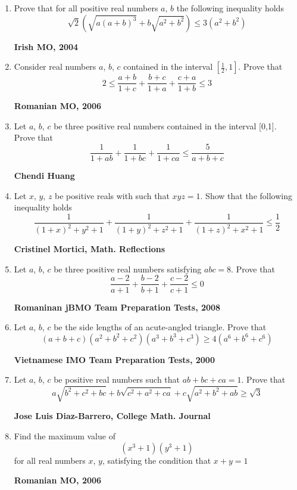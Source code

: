 \documentclass{article}
\begin{document}
\begin{enumerate}
\item Prove that for all positive real numbers $a $, $b $ the following inequality holds $$\sqrt {2}\left (\sqrt {a (a+b)^3}+b\sqrt {a^2+b^2} \right )\leq 3\left (a^2+b^2 \right )$$
\begin{flushright}
\textbf{Irish MO, 2004}
\end{flushright}
\item Consider real numbers  $a $, $b $, $c $ contained in the interval  $\left [\frac {1}{2},1 \right ]$. Prove that $$2\leq \frac{a+b}{1+c}+ \frac{b+c}{1+a} +\frac{c+a}{1+b}\leq 3$$
\begin {flushright}
\textbf{Romanian MO, 2006}
\end{flushright}
\item Let $a$, $b$, $c$ be three positive real numbers contained in the interval  [0,1]. Prove that $$\frac {1}{1+ab}+\frac {1}{1+bc}+\frac {1}{1+ca}\leq \frac {5}{a+b+c}$$
\begin {flushright}
\textbf{Chendi Huang}
\end{flushright}
\item Let $x $, $y $, $z $ be positive reals with such that  $xyz=1$. Show that the following inequality holds $$\frac{1}{(1+x)^2+y^2+1}+\frac{1}{(1+y)^2+z^2+1}+\frac{1}{(1+z)^2+x^2+1} \leq  \frac{1}{2}$$ 
\begin {flushright}
\textbf{Cristinel Mortici, Math. Reflections}
\end{flushright}
\item Let $a$, $b$, $c$ be three positive real numbers satisfying $abc=8$. Prove that $$\frac {a-2}{a+1}+\frac {b-2}{b+1}+\frac {c-2}{c+1}\leq 0$$
\begin {flushright}
\textbf{Romaninan jBMO Team Preparation Tests, 2008}
\end{flushright}
\item Let $a$, $b$, $c$ be the side lengths of an acute-angled triangle. Prove that $$(a+b+c)(a^2+b^2+c^2)(a^3+b^3+c^3) \geq 4(a^6+b^6+c^6)$$
\begin {flushright}
\textbf{Vietnamese IMO Team Preparation Tests, 2000}
\end{flushright}
\item Let $a$, $b$, $c$ be positive real numbers such that $ab+bc+ca=1$. Prove that $$a\sqrt {b^2+c^2+bc} + b\sqrt {c^2+a^2+ca}+c\sqrt {a^2+b^2+ab}\geq \sqrt {3}$$
\begin {flushright}
\textbf{Jose Luis Diaz-Barrero, College Math. Journal}
\end{flushright}
\item Find the maximum value of $$(x^3+1)(y^3+1)$$ for all real numbers $x $, $y $, satisfying the condition that $x+y=1$
\begin {flushright}
\textbf{Romanian MO, 2006}
\end{flushright}
\pagebreak


\end{enumerate}
\end{document}
